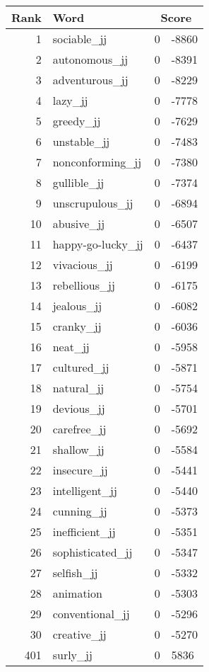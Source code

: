 \begin{longtable}[!htbp]{| rlr@{.}l |}
    \hline
    \textbf{Rank} & \textbf{Word} & \multicolumn{2}{c|}{\textbf{Score}} \\
    \hline
    \endhead
    1 & sociable\_jj & 0 & -8860 \\
    2 & autonomous\_jj & 0 & -8391 \\
    3 & adventurous\_jj & 0 & -8229 \\
    4 & lazy\_jj & 0 & -7778 \\
    5 & greedy\_jj & 0 & -7629 \\
    6 & unstable\_jj & 0 & -7483 \\
    7 & nonconforming\_jj & 0 & -7380 \\
    8 & gullible\_jj & 0 & -7374 \\
    9 & unscrupulous\_jj & 0 & -6894 \\
    10 & abusive\_jj & 0 & -6507 \\
    11 & happy-go-lucky\_jj & 0 & -6437 \\
    12 & vivacious\_jj & 0 & -6199 \\
    13 & rebellious\_jj & 0 & -6175 \\
    14 & jealous\_jj & 0 & -6082 \\
    15 & cranky\_jj & 0 & -6036 \\
    16 & neat\_jj & 0 & -5958 \\
    17 & cultured\_jj & 0 & -5871 \\
    18 & natural\_jj & 0 & -5754 \\
    19 & devious\_jj & 0 & -5701 \\
    20 & carefree\_jj & 0 & -5692 \\
    21 & shallow\_jj & 0 & -5584 \\
    22 & insecure\_jj & 0 & -5441 \\
    23 & intelligent\_jj & 0 & -5440 \\
    24 & cunning\_jj & 0 & -5373 \\
    25 & inefficient\_jj & 0 & -5351 \\
    26 & sophisticated\_jj & 0 & -5347 \\
    27 & selfish\_jj & 0 & -5332 \\
    28 & animation & 0 & -5303 \\
    29 & conventional\_jj & 0 & -5296 \\
    30 & creative\_jj & 0 & -5270 \\
    401 & surly\_jj & 0 & 5836 \\

\end{longtable}
